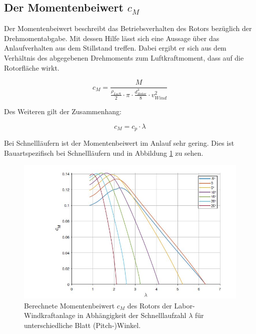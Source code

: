 \newpage
\subsection{Der Momentenbeiwert \texorpdfstring{$c_M$}{}}

Der Momentenbeiwert beschreibt das Betriebsverhalten des Rotors bezüglich der Drehmomentabgabe. Mit dessen Hilfe lässt sich eine Aussage über das Anlaufverhalten aus dem Stillstand treffen. Dabei ergibt er sich aus dem Verhältnis des abgegebenen Drehmoments zum Luftkraftmoment, dass auf die Rotorfläche wirkt.

\begin{equation}
  c_{M}= \frac{M}{ \frac{\rho_{Luft}}{2}\cdot \pi \cdot \frac{d^3_{Rotor}}{8} \cdot v^2_{Wind} }
    \label{eq:Momentenbeiwert_cm}
\end{equation}

Des Weiteren gilt der Zusammenhang:

\begin{equation}
  c_{M}= c_{p} \cdot \lambda
    \label{eq:Momentenbeiwert_cm2}
\end{equation}

Bei Schnellläufern ist der Momentenbeiwert im Anlauf sehr gering. Dies ist Bauartspezifisch bei Schnellläufern und in Abbildung \ref{fig:cmzulambda} zu sehen.

\begin{figure}[H]
    \centering
    \includegraphics[width=1\textwidth]{Abbildungen/cm.jpg}
    \caption{Berechnete Momentenbeiwert $c_{M}$ des Rotors der Labor-Windkraftanlage in Abhängigkeit der Schnelllaufzahl $\lambda$ für unterschiedliche Blatt (Pitch-)Winkel.\cite{Anleitung} }
    \label{fig:cmzulambda}
\end{figure}
\newpage
